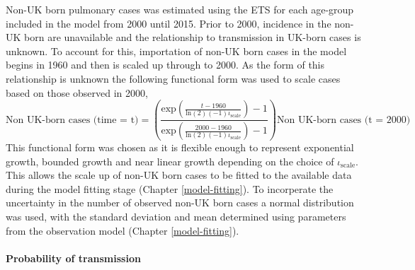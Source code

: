 \documentclass[11pt,twoside]{bristolthesis}
\begin{document}
  Non-UK born pulmonary cases was estimated using the ETS for each age-group included in the model from 2000 until 2015. Prior to 2000, incidence in the non-UK born are unavailable and the relationship to transmission in UK-born cases is unknown. To account for this, importation of non-UK born cases in the model begins in 1960 and then is scaled up through to 2000. As the form of this relationship is unknown the following functional form was used to scale cases based on those observed in 2000,
  \begin{equation}
  \text{Non UK-born cases (time = t)} = \left(\frac{\text{exp}\left(\frac{t - 1960}{\text{ln}(2) (-1) \iota_{\text{scale}}}\right) - 1}{\text{exp}\left(\frac{2000 - 1960}{\text{ln}(2) (-1) \iota_{\text{scale}}}\right) - 1}\right) \text{Non UK-born cases (t = 2000)}
    \label{eq:non-uk-born-scale}
  \end{equation}
  This functional form was chosen as it is flexible enough to represent exponential growth, bounded growth and near linear growth depending on the choice of \(\iota_{\text{scale}}\). This allows the scale up of non-UK born cases to be fitted to the available data during the model fitting stage (Chapter \ref{model-fitting}). To incorperate the uncertainty in the number of observed non-UK born cases a normal distribution was used, with the standard deviation and mean determined using parameters from the observation model (Chapter \ref{model-fitting}).
  
  \hypertarget{probability-of-transmission}{%
  \paragraph{Probability of transmission}\label{probability-of-transmission}}
  
\end{document}
